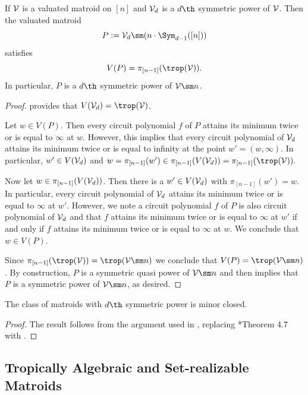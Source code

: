 \begin{lemma}\label{lem:geometricDeletion}
    If $\mathcal{V}$ is a valuated matroid on $[n]$ and $\mathcal{V}_d$ is a $d\th$ symmetric power of $\mathcal{V}$. Then the valuated matroid
    $$P:=\sV_d\sm(n\cdot \Sym_{d-1}([n]))$$
    satisfies
    $$V(P) = \pi_{[n-1]}(\trop(\sV)).$$
    In particular, $P$ is a $d\th$ symmetric power of $\sV\sm n$.
\end{lemma}
\begin{proof}
 provides that $V(\sV_d)=\trop(\sV)$.

Let $w\in V(P)$. Then every circuit polynomial $f$ of $P$ attains its minimum twice or is equal to $\infty$ at $w$. However, this implies that every circuit polynomial of $\mathcal{V}_d$ attains its minimum twice or is equal to infinity at the point $w'=(w,\infty).$ In particular, $w'\in V(\mathcal{V}_d)$ and $w=\pi_{[n-1]}(w')\in \pi_{[n-1]}(V(\sV_d))=\pi_{[n-1]}(\trop(\sV)).$

Now let $w\in \pi_{[n-1]}(V(\mathcal{V}_d))$. Then there is a $w' \in V(\mathcal{V}_d)$ with $\pi_{[n-1]}(w')=w$. In particular, every circuit polynomial of $\mathcal{V}_d$ attains its minimum twice or is equal to $\infty$ at $w'$. However, we note a circuit polynomial $f$ of $P$ is also circuit polynomial of $\mathcal{V}_d$ and that $f$ attains its minimum twice or is equal to $\infty$ at $w'$ if and only if $f$ attains its minimum twice or is equal to $\infty$ at $w$. We conclude that $w\in V(P)$.

Since $\pi_{[n-1]}(\trop(\sV))=\trop(\sV\sm n)$ we conclude that $V(P)=\trop(\sV\sm n)$. By construction, $P$ is a symmetric quasi power of $\sV\sm n$ and  then implies that $P$ is a symmetric power of $\sV\sm n$, as desired.
\end{proof}

\begin{corollary}\label{cor:minorClosed}
    The class of matroids with $d\th$ symmetric power is minor closed.
\end{corollary}
\begin{proof}
    The result follows from the argument used in , replacing \cite{MR20}*{Theorem 4.7} with .
\end{proof}


\subsection{Tropically Algebraic and Set-realizable Matroids}\label{subsec:A&StRealizable}

